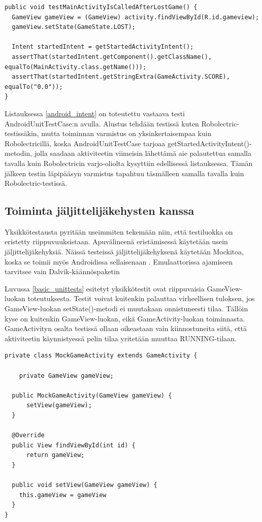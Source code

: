 \begin{lstlisting}[float,label=android_intent,caption=Aikeen tilatietojen tarkastelu ActivityUnitTestCasen avulla]
public void testMainActivityIsCalledAfterLostGame() {
  GameView gameView = (GameView) activity.findViewById(R.id.gameview);
  gameView.setState(GameState.LOST);
  	
  Intent startedIntent = getStartedActivityIntent();
  assertThat(startedIntent.getComponent().getClassName(), equalTo(MainActivity.class.getName()));
  assertThat(startedIntent.getStringExtra(GameActivity.SCORE), equalTo("0.0"));
}
\end{lstlisting}

Listauksessa \ref{android_intent} on toteutettu vastaava testi AndroidUnitTestCase:n avulla. Alustus tehdään testissä kuten Robolectric-testissäkin, mutta toiminnan varmistus on yksinkertaisempaa kuin Robolectricillä, koska AndroidUnitTestCase tarjoaa getStartedActivityIntent()-metodin, jolla saadaan aktiviteetin viimeisin lähettämä aie palautettua samalla tavalla kuin Robolectricin varjo-oliolta kysyttiin edellisessä listauksessa. Tämän jälkeen testin läpipääsyn varmistus tapahtuu täsmälleen samalla tavalla kuin Robolectric-testissä.

\subsection{Toiminta jäljittelijäkehysten kanssa}

Yksikkötestausta pyritään useimmiten tekemään niin, että testiluokka on eristetty riippuvuuksistaan. Apuvälineenä eristämisessä käytetään usein jäljittelijäkehyksiä. Näissä testeissä jäljittelijäkehyksenä käytetään Mockitoa, koska se toimii myös Androidissa sellaisenaan \cite{mockito}. Emulaattorissa ajamiseen tarvitsee vain Dalvik-käännöspaketin

Luvussa \ref{basic_unittests} esitetyt yksikkötestit ovat riippuvaisia GameView-luokan toteutuksesta. Testit voivat kuitenkin palauttaa virheellisen tuloksen, jos GameView-luokan setState()-metodi ei muutakaan onnistuneesti tilaa. Tällöin kyse on kuitenkin GameView-luokan, eikä GameActivity-luokan toiminnasta. GameActivityn osalta testissä ollaan oikeastaan vain kiinnostuneita siitä, että aktiviteetin käynnistyessä pelin tilaa yritetään muuttaa RUNNING-tilaan.

\begin{lstlisting}[float,label=mock_subclass, caption=Jäljittelijäaliluokka]
private class MockGameActivity extends GameActivity {
	
	private GameView gameView;

  public MockGameActivity(GameView gameView) {
	  setView(gameView);
  }

  @Override
  public View findViewById(int id) {
	  return gameView;
  }
  
  public void setView(GameView gameView) {
    this.gameView = gameView
  }
}
\end{lstlisting}

